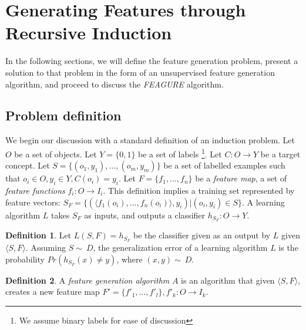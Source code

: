 \documentclass{article}
\theoremstyle{definition}
\newtheorem{defn}{Definition}[section]
\begin{document}

\section{Generating Features through Recursive Induction} \label{formal}

In the following sections, we will define the feature generation problem, present a solution to that problem in the form of an unsupervised feature generation algorithm, and proceed to discuss the \emph{FEAGURE} algorithm. %

\subsection{Problem definition}

We begin our discussion with a standard definition of an induction problem. 
Let $O$ be a set of objects. Let $Y=\{0,1\}$ be a set of labels \footnote{We assume binary labels for ease of discussion}. Let $C:O\rightarrow Y$ be a target concept. Let $S=\{(o_{1},y_{1}),\ldots,(o_{m},y_{m})\}$ be a set of labelled examples such that $o_{i}\in O, y_{i}\in Y, C(o_i)=y_i$. 
Let $F=\{f_{1},\ldots,f_{n}\}$ be a \emph{feature map}, a set of \emph{feature functions} $f_{i}:O\rightarrow I_{i}$.  This definition implies a training set represented by feature vectors: $S_F=\{ (\langle f_1(o_i),\ldots,f_n(o_i)\rangle, y_i) | (o_i,y_i) \in S\}$. A learning algorithm $L$ takes $S_F$ as inputs, and outputs a classifier $h_{S_F}:O\rightarrow Y$.
\begin{defn}
	Let $L(S,F)=h_{S_F}$ be the classifier given as an output by $L$ given $\langle S,F\rangle$. Assuming $S\sim\ D$, the generalization error of a learning algorithm $L$ is the probability $Pr(h_{S_F}(x)\neq y)$, where $(x,y)\sim\ D$.
\end{defn}

\begin{defn}
	A \emph{feature generation algorithm} $A$ is an algorithm that given $\langle S,F\rangle$, creates a new feature map $F'=\{f'_{1},\ldots,f'_{l}\}, f'_{k}:O\rightarrow I_k$.
\end{defn}
\end{document}
